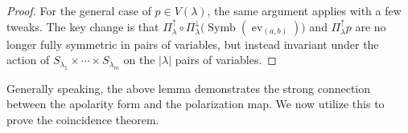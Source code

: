 \documentclass{article}
\theoremstyle{definition}
\theoremstyle{plain}
\DeclareMathOperator{\Symb}{Symb}
\DeclareMathOperator{\ev}{ev}
\begin{document}
\begin{proof}
    For the general case of $p \in V(\lambda)$, the same argument applies with a few tweaks. The key change is that $\Pi_\lambda^\uparrow \circ \Pi_\lambda^\downarrow\big(\Symb(\ev_{(a,b)})\big)$ and $\Pi_\lambda^\uparrow p$ are no longer fully symmetric in pairs of variables, but instead invariant under the action of $S_{\lambda_1} \times \cdots \times S_{\lambda_m}$ on the $|\lambda|$ pairs of variables.
\end{proof}

Generally speaking, the above lemma demonstrates the strong connection between the apolarity form and the polarization map. We now utilize this to prove the coincidence theorem.
\end{document}
